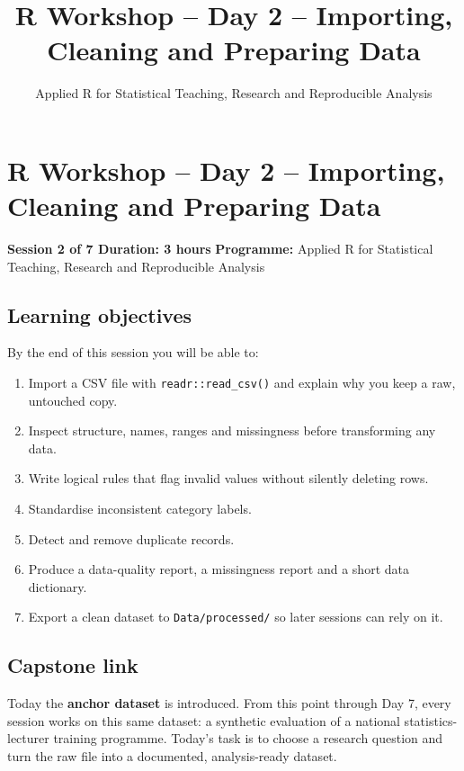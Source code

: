 \documentclass[11pt]{article}
\title{R Workshop -- Day 2 -- Importing, Cleaning and Preparing Data}
\author{Applied R for Statistical Teaching, Research and Reproducible Analysis}
\date{}
\providecommand{\tightlist}{%
  \setlength{\itemsep}{0pt}\setlength{\parskip}{0pt}}
\begin{document}
\maketitle
\tableofcontents
\newpage
\hypertarget{r-workshop-day-2-importing-cleaning-and-preparing-data}{%
\section{R Workshop -- Day 2 -- Importing, Cleaning and Preparing
Data}\label{r-workshop-day-2-importing-cleaning-and-preparing-data}}

\textbf{Session 2 of 7 \textbar{} Duration: 3 hours} \textbf{Programme:}
Applied R for Statistical Teaching, Research and Reproducible Analysis

\hypertarget{learning-objectives}{%
\subsection{Learning objectives}\label{learning-objectives}}

By the end of this session you will be able to:

\begin{enumerate}
\def\labelenumi{\arabic{enumi}.}
\tightlist
\item
  Import a CSV file with \texttt{readr::read\_csv()} and explain why you
  keep a raw, untouched copy.
\item
  Inspect structure, names, ranges and missingness before transforming
  any data.
\item
  Write logical rules that flag invalid values without silently deleting
  rows.
\item
  Standardise inconsistent category labels.
\item
  Detect and remove duplicate records.
\item
  Produce a data-quality report, a missingness report and a short data
  dictionary.
\item
  Export a clean dataset to \texttt{Data/processed/} so later sessions
  can rely on it.
\end{enumerate}

\hypertarget{capstone-link}{%
\subsection{Capstone link}\label{capstone-link}}

Today the \textbf{anchor dataset} is introduced. From this point through
Day 7, every session works on this same dataset: a synthetic evaluation
of a national statistics-lecturer training programme. Today's task is to
choose a research question and turn the raw file into a documented,
analysis-ready dataset.
\end{document}
